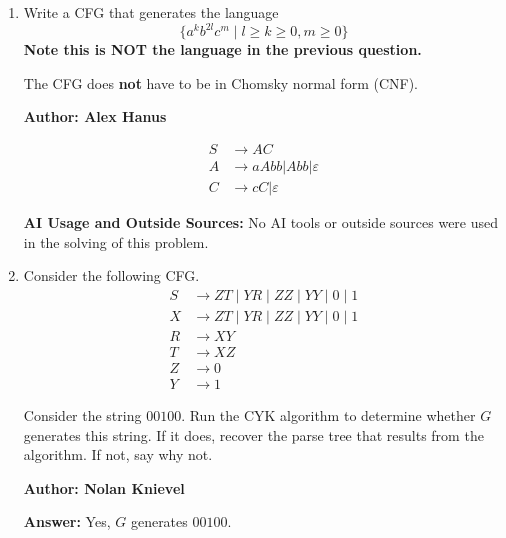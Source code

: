 \documentclass{article}
\theoremstyle{definition}
\newenvironment {solution}
{
\begin{tcolorbox}[breakable]
}
{
\end{tcolorbox}
}
\begin{document}
\begin{enumerate}
\begin{solution}
\end{solution}


\item Write a CFG that generates the language
\[
    \{a^kb^{2l}c^m \mid l \geq k \geq 0, m \geq 0\}
\]
\textbf{Note this is NOT the language in the previous question.}


The CFG does \textbf{not} have to be in Chomsky normal form (CNF).

\begin{solution}
\textbf{Author: Alex Hanus}

\vspace{0.5cm}

\begin{align*}
    S  &\rightarrow AC\\
    A &\rightarrow aAbb | Abb | \varepsilon\\
    C &\rightarrow cC | \varepsilon
\end{align*}

\vspace{0.5cm}

\textbf{AI Usage and Outside Sources: }No AI tools or outside sources were used in the solving of this problem.

\end{solution}

\item Consider the following CFG.
\begin{align*}
    S &\rightarrow ZT \mid YR \mid ZZ \mid YY \mid 0 \mid 1\\
    X &\rightarrow ZT \mid YR \mid ZZ \mid YY \mid 0 \mid 1\\   
    R &\rightarrow XY\\
    T &\rightarrow XZ \\
    Z &\rightarrow 0 \\
    Y &\rightarrow 1
\end{align*} 

Consider the string $00100$. Run the CYK algorithm to determine whether $G$ generates this string. If it does, recover the parse tree that results from the algorithm. If not, say why not.

\begin{solution}
\textbf{Author: Nolan Knievel}

\vspace{0.5cm}

\textbf{Answer:} Yes, $G$ generates $00100$.

\vspace{0.5cm}


\end{solution}
\end{enumerate}
\end{document}
